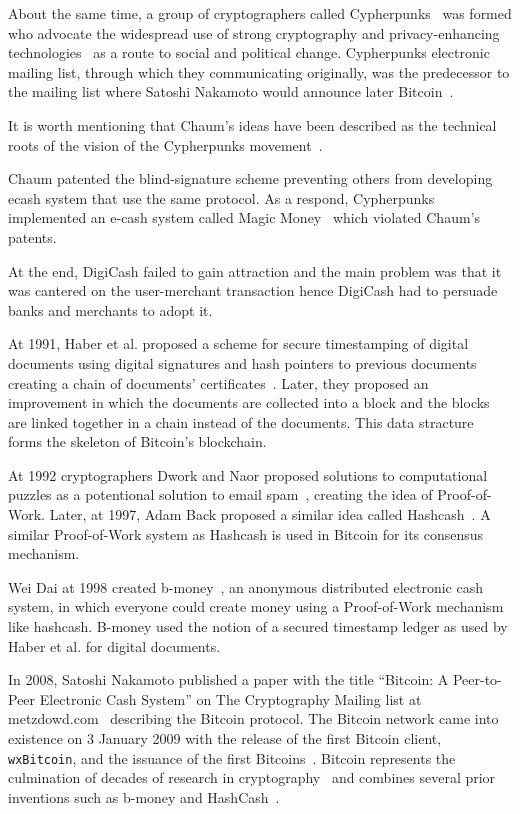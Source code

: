 About the same time, a group of cryptographers called Cypherpunks~\cite{cypherpunk,cypherpunks_manifesto} was formed who advocate the widespread
use of strong cryptography and privacy-enhancing technologies~\cite{cypherpunks_manifesto} as a route to social and political change. Cypherpunks electronic mailing list,
through which they communicating originally, was the predecessor to the mailing list where Satoshi Nakamoto would announce later Bitcoin~\cite{nakamoto2012bitcoin}.

It is worth mentioning that Chaum's ideas have been described as the technical roots of the vision of the Cypherpunks movement~\cite{cypherpunk}.

Chaum patented the blind-signature scheme preventing others from developing ecash system that use the same protocol. As a respond,
Cypherpunks implemented an e-cash system called Magic Money~\cite{magic_money} which violated Chaum's patents.

At the end, DigiCash failed to gain attraction and the main problem was that it was cantered on the user-merchant transaction hence
DigiCash had to persuade banks and merchants to adopt it.

At 1991, Haber et al. proposed a scheme for secure timestamping of digital documents using digital signatures and hash pointers to previous documents
creating a chain of documents' certificates~\cite{Haber1991}. Later, they proposed an improvement in which the documents are collected into a block and
the blocks are linked together in a chain instead of the documents. This data stracture forms the skeleton of Bitcoin's blockchain.

At 1992 cryptographers Dwork and Naor proposed solutions to computational puzzles as a potentional solution to email spam~\cite{Dwork1993},
creating the idea of Proof-of-Work. Later, at 1997, Adam Back proposed a similar idea called Hashcash~\cite{hash_cash}.
A similar Proof-of-Work system as Hashcash is used in Bitcoin for its consensus mechanism.

Wei Dai at 1998 created b-money~\cite{b_money}, an anonymous distributed electronic cash system, in which everyone could create money using a Proof-of-Work mechanism like hashcash. B-money used the notion of a secured timestamp ledger as used by Haber et al. for digital documents.

In 2008, Satoshi Nakamoto published a paper with the title ``Bitcoin: A Peer-to-Peer Electronic Cash System'' on The Cryptography Mailing list at metzdowd.com~\cite{satoshi_mailing_list} describing the Bitcoin protocol. The Bitcoin network came into existence on 3 January 2009 with the release of the first Bitcoin client, \verb|wxBitcoin|, and the issuance of the first Bitcoins~\cite{btc_client, btc_first_block}. Bitcoin represents the culmination of decades of research in cryptography~\cite{antonopoulos2014mastering} and combines several prior inventions such as b-money and HashCash~\cite{antonopoulos2014mastering}.


